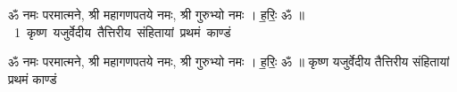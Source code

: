\documentclass[17pt]{extarticle}
\begin{document}
\begin{titlepage}
    \begin{center}
 
\begin{sanskrit}
    { \Large
    ॐ नमः परमात्मने, श्री महागणपतये नमः, 
श्री गुरुभ्यो नमः । ह॒रिः॒ ॐ ॥ 
    }
    \\
    \vspace{2.5cm}
    \mbox{ \Huge
    1       कृष्ण यजुर्वेदीय तैत्तिरीय संहितायां प्रथमं काण्डं   }
\end{sanskrit}
\end{center}

\end{titlepage}
\tableofcontents

ॐ नमः परमात्मने, श्री महागणपतये नमः, 
श्री गुरुभ्यो नमः । ह॒रिः॒ ॐ ॥        कृष्ण यजुर्वेदीय तैत्तिरीय संहितायां प्रथमं काण्डं \newline
\end{document}

